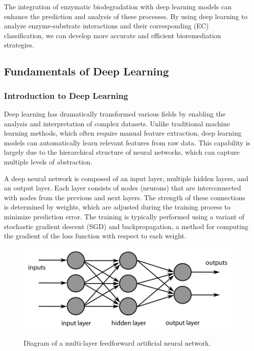 The integration of enzymatic biodegradation with deep learning models can enhance the prediction and analysis of these processes. By using deep learning to analyze enzyme-substrate interactions and their corresponding (EC) classification, we can develop more accurate and efficient bioremediation strategies.

\subsection{Fundamentals of Deep Learning}
\label{sec:Fundamentals of Deep Learning}

\subsubsection{Introduction to Deep Learning}
\label{sec:Introduction to Deep Learning}

Deep learning has dramatically transformed various fields by enabling the analysis and interpretation of complex datasets. Unlike traditional machine learning methods, which often require manual feature extraction, deep learning models can automatically learn relevant features from raw data. This capability is largely due to the hierarchical structure of neural networks, which can capture multiple levels of abstraction.

A deep neural network is composed of an input layer, multiple hidden layers, and an output layer. Each layer consists of nodes (neurons) that are interconnected with nodes from the previous and next layers. The strength of these connections is determined by weights, which are adjusted during the training process to minimize prediction error. The training is typically performed using a variant of stochastic gradient descent (SGD) and backpropagation, a method for computing the gradient of the loss function with respect to each weight.

\newpage

\begin{figure}[hbt]
    \centering
    \begin{minipage}[t]{.9\textwidth}
    \caption{Diagram of a multi-layer feedforward artificial neural network.}
    \includegraphics[width=1\textwidth]{img/MultiLayer Neural Network Bigger.png}\\
    \label{fig:feedforward_neural_network}
    \end{minipage}
\end{figure}

